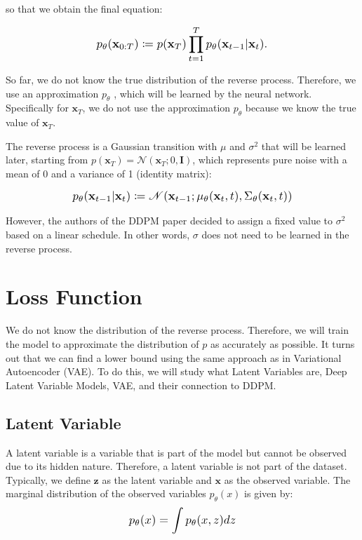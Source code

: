 \documentclass{article}
\newcommand*{\Scale}[2][4]{\scalebox{#1}{\ensuremath{#2}}}
\begin{document}
so that we obtain the final equation:

\begin{equation}
\Scale[1.2]{ \displaystyle
p_\theta(\textbf{x}_{0:T}) \coloneq p(\textbf{x}_T) \displaystyle \prod_{t=1}^{T} p_\theta(\textbf{x}_{t-1}|\textbf{x}_{t}). }
\end{equation}

So far, we do not know the true distribution of the reverse process. Therefore, we use an approximation $ p_\theta $ 
 , which will be learned by the neural network. Specifically for $ \textbf{x}_{T} $, we do not use the approximation $ p_\theta $ because we know the true value of $ \textbf{x}_{T} $.

The reverse process is a Gaussian transition with $ \mu $ and $ \sigma^2 $ that will be learned later, starting from $ p(\textbf{x}_T) = \mathscr{N}(\textbf{x}_T;0,\textbf{I}) $, which represents pure noise with a mean of 0 and a variance of 1 (identity matrix):

\begin{equation}
\Scale[1.2]{ \displaystyle
p_\theta(\textbf{x}_{t-1}|\textbf{x}_{t}) \coloneq \mathscr{N}(\textbf{x}_{t-1};\mu_\theta(\textbf{x}_{t},t),\Sigma_\theta(\textbf{x}_t,t)) }
\end{equation}

However, the authors of the DDPM paper decided to assign a fixed value to $ \sigma^2 $ based on a linear schedule. In other words, $ \sigma $ does not need to be learned in the reverse process.


\section{Loss Function}


We do not know the distribution of the reverse process. Therefore, we will train the model to approximate the distribution of $ p $ as accurately as possible. It turns out that we can find a lower bound using the same approach as in Variational Autoencoder (VAE). To do this, we will study what Latent Variables are, Deep Latent Variable Models, VAE, and their connection to DDPM.


\subsection{Latent Variable}


A latent variable is a variable that is part of the model but cannot be observed due to its hidden nature. Therefore, a latent variable is not part of the dataset. Typically, we define $ \textbf{z} $ as the latent variable and $ \textbf{x} $  as the observed variable. The marginal distribution of the observed variables $ p_\theta(x) $ is given by:
\begin{equation}
\Scale[1.2]{\displaystyle p_\theta(x) = \int p_\theta(x,z) dz }
\end{equation}
\end{document}
